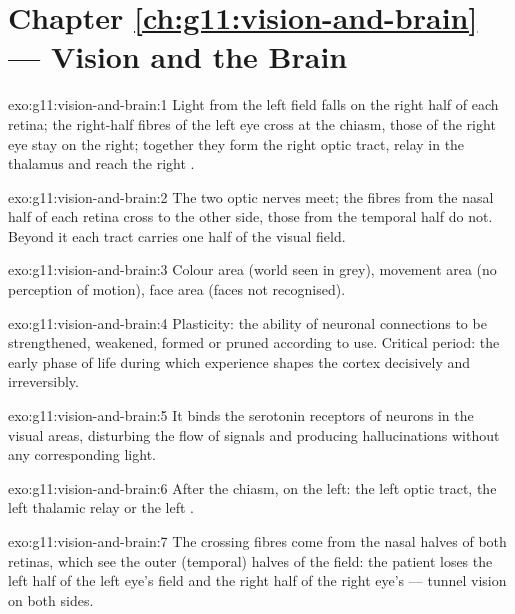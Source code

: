 \section*{Chapter \ref{ch:g11:vision-and-brain} --- Vision and the Brain}

\begin{solution}{exo:g11:vision-and-brain:1}
Light from the left field falls on the right half of each retina; the
right-half fibres of the left eye cross at the chiasm, those of the
right eye stay on the right; together they form the right optic
tract, relay in the thalamus and reach the right .
\end{solution}

\begin{solution}{exo:g11:vision-and-brain:2}
The two optic nerves meet; the fibres from the nasal half of each
retina cross to the other side, those from the temporal half do not.
Beyond it each tract carries one half of the visual field.
\end{solution}

\begin{solution}{exo:g11:vision-and-brain:3}
Colour area (world seen in grey), movement area (no perception of
motion), face area (faces not recognised).
\end{solution}

\begin{solution}{exo:g11:vision-and-brain:4}
Plasticity: the ability of neuronal connections to be strengthened,
weakened, formed or pruned according to use. Critical period: the
early phase of life during which experience shapes the cortex
decisively and irreversibly.
\end{solution}

\begin{solution}{exo:g11:vision-and-brain:5}
It binds the serotonin receptors of neurons in the visual areas,
disturbing the flow of signals and producing hallucinations without
any corresponding light.
\end{solution}

\begin{solution}{exo:g11:vision-and-brain:6}
After the chiasm, on the left: the left optic tract, the left
thalamic relay or the left .
\end{solution}

\begin{solution}{exo:g11:vision-and-brain:7}
The crossing fibres come from the nasal halves of both retinas, which
see the outer (temporal) halves of the field: the patient loses the
left half of the left eye's field and the right half of the right
eye's --- tunnel vision on both sides.
\end{solution}

